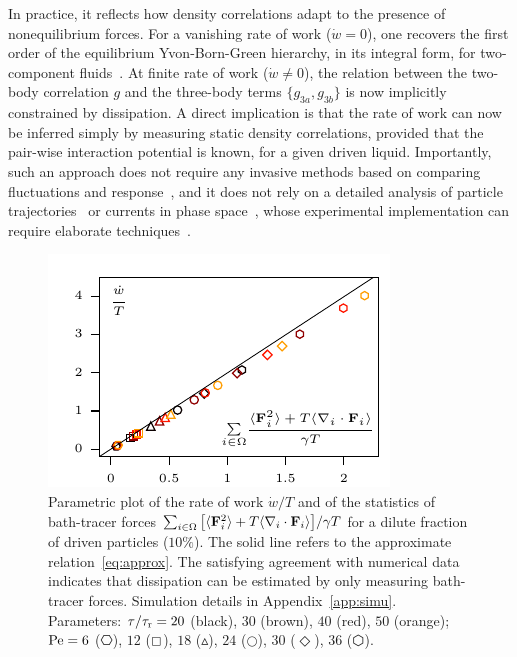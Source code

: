 \documentclass[superscriptaddress, twocolumn, prx, longbibliography, nofootinbib]{revtex4-1}
\begin{document}
In practice, it reflects how density correlations adapt to the presence of nonequilibrium forces. For a vanishing rate of work ($\dot w = 0$), one recovers the first order of the equilibrium Yvon-Born-Green hierarchy, in its integral form, for two-component fluids~\cite{Hansen2013}. At finite rate of work ($\dot w\neq0$), the relation between the two-body correlation $g$ and the three-body terms $\{g_{3a},g_{3b}\}$ is now implicitly constrained by dissipation. A direct implication is that the rate of work can now be inferred simply by measuring static density correlations, provided that the pair-wise interaction potential is known, for a given driven liquid. Importantly, such an approach does not require any invasive methods based on comparing fluctuations and response~\cite{Harada2005, Mizuno2007, Visco2015, Turlier2016, Ahmed2018}, and it does not rely on a detailed analysis of particle trajectories~\cite{Roldan2018, Parrondo2018} or currents in phase space~\cite{Gingrich2017, Li2018}, whose experimental implementation can require elaborate techniques~\cite{Battle604, Mura2018}.


\begin{figure}
	\centering
	\includegraphics[width=\linewidth]{fig1.pdf}
	\caption{\label{fig:fig1}
		Parametric plot of the rate of work $\dot w/T$ and of the statistics of bath-tracer forces $\sum_{i\in\Omega}\big[\langle{\bf F}_i^2\rangle + T\langle\nabla_i\cdot{\bf F}_i\rangle\big]/\gamma T$ for a dilute fraction of driven particles ($10\%$). The solid line refers to the approximate relation~\eqref{eq:approx}. The satisfying agreement with numerical data indicates that dissipation can be estimated by only measuring bath-tracer forces.
		Simulation details in Appendix~\ref{app:simu}. Parameters: $\tau/\tau_{\rm r}=20$ (black), $30$ (brown), $40$ (red), $50$ (orange); ${\rm Pe}=6$ ($\hexagon$), $12$ ($\boxempty$), $18$ ({\large$\vartriangle$}), $24$ ({$\Circle$}), $30$ (${\Diamond}$), $36$ ($\varhexagon$).
	}
\end{figure}
\end{document}
